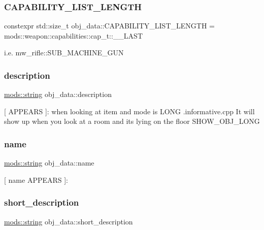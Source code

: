 \subsubsection{\texorpdfstring{C\+A\+P\+A\+B\+I\+L\+I\+T\+Y\+\_\+\+L\+I\+S\+T\+\_\+\+L\+E\+N\+G\+TH}{CAPABILITY\_LIST\_LENGTH}}
{\footnotesize\ttfamily constexpr std\+::size\+\_\+t obj\+\_\+data\+::\+C\+A\+P\+A\+B\+I\+L\+I\+T\+Y\+\_\+\+L\+I\+S\+T\+\_\+\+L\+E\+N\+G\+TH = mods\+::weapon\+::capabilities\+::cap\+\_\+t\+::\+\_\+\+\_\+\+L\+A\+ST\hspace{0.3cm}{\ttfamily [static]}}

i.\+e. mw\+\_\+rifle\+::\+S\+U\+B\+\_\+\+M\+A\+C\+H\+I\+N\+E\+\_\+\+G\+UN \mbox{\label{structobj__data_ac48d7cdab17efaf5e9664bbbf9a15ffb}} 
\subsubsection{\texorpdfstring{description}{description}}
{\footnotesize\ttfamily \hyperlink{structmods_1_1string}{mods\+::string} obj\+\_\+data\+::description}

\mbox{[} A\+P\+P\+E\+A\+RS \mbox{]}\+: when looking at item and mode is L\+O\+NG .informative.\+cpp It will show up when you look at a room and it\textquotesingle{}s lying on the floor S\+H\+O\+W\+\_\+\+O\+B\+J\+\_\+\+L\+O\+NG \mbox{\label{structobj__data_a6a6eff873924a8df3aa0562c425e477b}} 
\subsubsection{\texorpdfstring{name}{name}}
{\footnotesize\ttfamily \hyperlink{structmods_1_1string}{mods\+::string} obj\+\_\+data\+::name}

\mbox{[} \textquotesingle{}name\textquotesingle{} A\+P\+P\+E\+A\+RS \mbox{]}\+: \mbox{\label{structobj__data_a38420e39fa29369569eab896fd57ded7}} 
\subsubsection{\texorpdfstring{short\+\_\+description}{short\_description}}
{\footnotesize\ttfamily \hyperlink{structmods_1_1string}{mods\+::string} obj\+\_\+data\+::short\+\_\+description}

